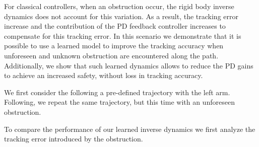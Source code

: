     For classical controllers, when an obstruction occur, the rigid body inverse dynamics does not account for this variation. 
    As a result, the tracking error increase and the contribution of the PD feedback controller increases to compensate for this tracking error.
	In this scenario we demonstrate that it is possible to use a learned model to improve the tracking accuracy when unforeseen and unknown obstruction are encountered along the path.
    Additionally, we show that such learned dynamics allows to reduce the PD gains to achieve an increased safety, without loss in tracking accuracy.
	
    We first consider the \robot{} following a pre-defined trajectory with the left arm.
    Following, we repeat the same trajectory, but this time with an unforeseen obstruction. 
    
   
    
    To compare the performance of our learned inverse dynamics we first analyze the tracking error introduced by the obstruction.
    
